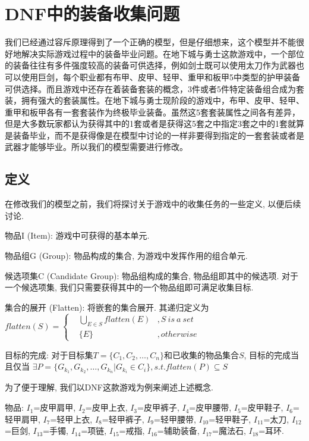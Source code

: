 \documentclass[10pt,journal,compsoc]{IEEEtran}
\begin{document}
\section{DNF中的装备收集问题}
  我们已经通过容斥原理得到了一个正确的模型，但是仔细想来，这个模型并不能很好地解决实际游戏过程中的装备毕业问题。在地下城与勇士这款游戏中，一个部位的装备往往有多件强度较高的装备可供选择，例如剑士既可以使用太刀作为武器也可以使用巨剑，每个职业都有布甲、皮甲、轻甲、重甲和板甲5中类型的护甲装备可供选择。而且游戏中还存在着装备套装的概念，3件或者5件特定装备组合成为套装，拥有强大的套装属性。在地下城与勇士现阶段的游戏中，布甲、皮甲、轻甲、重甲和板甲各有一套套装作为终极毕业装备。虽然这5套套装属性之间各有差异，但是大多数玩家都认为获得其中的1套或者是获得这5套之中指定3套之中的1套就算是装备毕业，而不是获得像是在模型中讨论的一样非要得到指定的一套套装或者是武器才能够毕业。所以我们的模型需要进行修改。


  \subsection{定义}

  在修改我们的模型之前，我们将探讨关于游戏中的收集任务的一些定义, 以便后续讨论. 
  
  物品I (Item): 游戏中可获得的基本单元.

  物品组G (Group): 物品构成的集合, 为游戏中发挥作用的组合单元.
  
  候选项集C (Candidate Group): 物品组构成的集合, 物品组即其中的候选项. 对于一个候选项集, 我们只需要获得其中的一个物品组即可满足收集目标. 
  
  
  集合的展开 (Flatten): 将嵌套的集合展开. 其递归定义为
  $
  flatten(S) = \left\{
    \begin{aligned}
      & \bigcup\limits_{E \in S} flatten(E) &, S~is~a~set \\
      & \{E\} &, otherwise
    \end{aligned}
  \right.
  $
  
  目标的完成: 对于目标集$T = \{C_1, C_2, \dots, C_n\}$和已收集的物品集合$S$, 目标的完成当且仅当
  $ \exists P = \{G_{k_1}, G_{k_2}, \dots, G_{k_n} | G_{k_i} \in C_i\}, s.t. flatten(P) \subseteq S$
  
  \vspace{5mm}
  为了便于理解, 我们以DNF这款游戏为例来阐述上述概念.
  
  物品: $I_1$=皮甲肩甲, $I_2$=皮甲上衣, $I_3$=皮甲裤子, $I_4$=皮甲腰带, $I_5$=皮甲鞋子, $I_6$=轻甲肩甲, $I_7$=轻甲上衣, $I_8$=轻甲裤子, $I_9$=轻甲腰带, $I_{10}$=轻甲鞋子, $I_{11}$=太刀, $I_{12}$=巨剑, $I_{13}$=手镯, $I_{14}$=项链, $I_{15}$=戒指, $I_{16}$=辅助装备, $I_{17}$=魔法石, $I_{18}$=耳环. 
  
\end{document}
